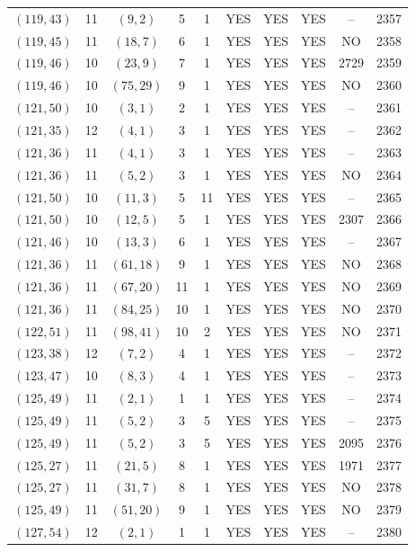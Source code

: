 \begin{longtable}{|c|c|c|c|c|c|c|c|c|c|}
$(119, 43)$ & 11 & $(9, 2)$ & 5 & 1 & YES & YES & YES & -- & 2357\\
$(119, 45)$ & 11 & $(18, 7)$ & 6 & 1 & YES & YES & YES & NO & 2358\\
$(119, 46)$ & 10 & $(23, 9)$ & 7 & 1 & YES & YES & YES & 2729 & 2359\\
$(119, 46)$ & 10 & $(75, 29)$ & 9 & 1 & YES & YES & YES & NO & 2360\\
$(121, 50)$ & 10 & $(3, 1)$ & 2 & 1 & YES & YES & YES & -- & 2361\\
$(121, 35)$ & 12 & $(4, 1)$ & 3 & 1 & YES & YES & YES & -- & 2362\\
$(121, 36)$ & 11 & $(4, 1)$ & 3 & 1 & YES & YES & YES & -- & 2363\\
$(121, 36)$ & 11 & $(5, 2)$ & 3 & 1 & YES & YES & YES & NO & 2364\\
$(121, 50)$ & 10 & $(11, 3)$ & 5 & 11 & YES & YES & YES & -- & 2365\\
$(121, 50)$ & 10 & $(12, 5)$ & 5 & 1 & YES & YES & YES & 2307 & 2366\\
$(121, 46)$ & 10 & $(13, 3)$ & 6 & 1 & YES & YES & YES & -- & 2367\\
$(121, 36)$ & 11 & $(61, 18)$ & 9 & 1 & YES & YES & YES & NO & 2368\\
$(121, 36)$ & 11 & $(67, 20)$ & 11 & 1 & YES & YES & YES & NO & 2369\\
$(121, 36)$ & 11 & $(84, 25)$ & 10 & 1 & YES & YES & YES & NO & 2370\\
$(122, 51)$ & 11 & $(98, 41)$ & 10 & 2 & YES & YES & YES & NO & 2371\\
$(123, 38)$ & 12 & $(7, 2)$ & 4 & 1 & YES & YES & YES & -- & 2372\\
$(123, 47)$ & 10 & $(8, 3)$ & 4 & 1 & YES & YES & YES & -- & 2373\\
$(125, 49)$ & 11 & $(2, 1)$ & 1 & 1 & YES & YES & YES & -- & 2374\\
$(125, 49)$ & 11 & $(5, 2)$ & 3 & 5 & YES & YES & YES & -- & 2375\\
$(125, 49)$ & 11 & $(5, 2)$ & 3 & 5 & YES & YES & YES & 2095 & 2376\\
$(125, 27)$ & 11 & $(21, 5)$ & 8 & 1 & YES & YES & YES & 1971 & 2377\\
$(125, 27)$ & 11 & $(31, 7)$ & 8 & 1 & YES & YES & YES & NO & 2378\\
$(125, 49)$ & 11 & $(51, 20)$ & 9 & 1 & YES & YES & YES & NO & 2379\\
$(127, 54)$ & 12 & $(2, 1)$ & 1 & 1 & YES & YES & YES & -- & 2380\\

\end{longtable}
